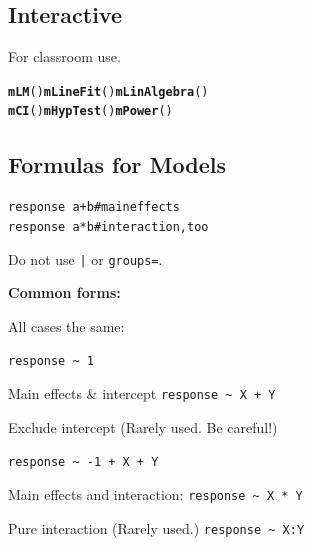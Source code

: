 \documentclass{report}\usepackage{graphicx, color}
\makeatletter
\newcommand{\hlfunctioncall}[1]{\textcolor[rgb]{0.501960784313725,0,0.329411764705882}{\textbf{#1}}}%
\newcommand{\hlcomment}[1]{\textcolor[rgb]{0.180392156862745,0.6,0.341176470588235}{#1}}%
\newenvironment{kframe}{%
 \def\at@end@of@kframe{}%
 \ifinner\ifhmode%
  \def\at@end@of@kframe{\end{minipage}}%
  \begin{minipage}{\columnwidth}%
 \fi\fi%
 \def\FrameCommand##1{\hskip\@totalleftmargin \hskip-\fboxsep
 \colorbox{shadecolor}{##1}\hskip-\fboxsep
     \hskip-\linewidth \hskip-\@totalleftmargin \hskip\columnwidth}%
 \MakeFramed {\advance\hsize-\width
   \@totalleftmargin\z@ \linewidth\hsize
   \@setminipage}}%
 {\par\unskip\endMakeFramed%
 \at@end@of@kframe}
\newenvironment{knitrout}{}{} %
\makeatother
\begin{document}
\begin{multicols}{4}
\subsection*{Interactive}
For classroom use.
\begin{knitrout}
\color{fgcolor}\begin{kframe}
\begin{alltt}
\hlfunctioncall{mLM}()  \hlfunctioncall{mLineFit}()  \hlfunctioncall{mLinAlgebra}()
\hlfunctioncall{mCI}()  \hlfunctioncall{mHypTest}() \hlfunctioncall{mPower}()
\end{alltt}
\end{kframe}
\end{knitrout}



\vfill

\columnbreak

\subsection*{Formulas for Models}
\begin{knitrout}
\color{fgcolor}\begin{kframe}
\begin{alltt}
response ~ a+b \hlcomment{# main effects}
response ~ a*b \hlcomment{# interaction, too}
\end{alltt}
\end{kframe}
\end{knitrout}

Do not use \verb+|+ or \verb+groups=+.

\medskip

{\bf Common forms:}

All cases the same:

\verb=response ~ 1=

\medskip

Main effects & intercept 
\verb=response ~ X + Y=

\medskip

Exclude intercept  (Rarely used.  Be careful!)

\verb=response ~ -1 + X + Y=

\medskip

Main effects and interaction:
\verb=response ~ X * Y=

\medskip

Pure interaction (Rarely used.)
\verb=response ~ X:Y=


\end{multicols}
\end{document}
